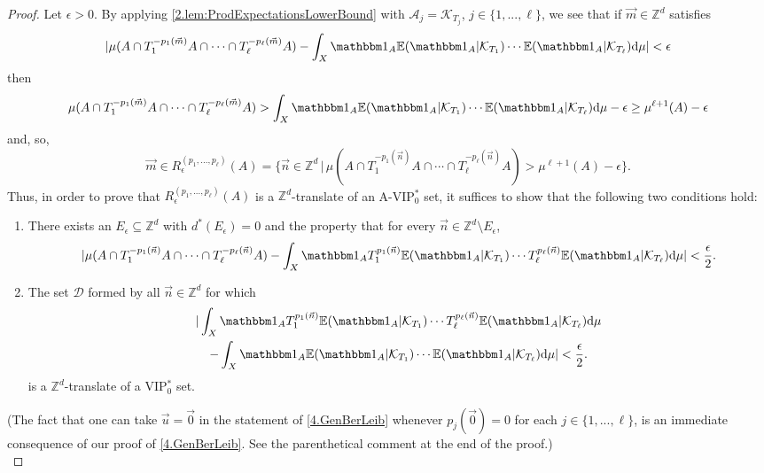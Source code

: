 \documentclass[11pt,american,preprint]{elsarticle}
\numberwithin{equation}{section}
\theoremstyle{plain}
\theoremstyle{plain*}
\theoremstyle{plain}
\theoremstyle{plain*}
\theoremstyle{plain}
\theoremstyle{plain*}
\theoremstyle{remark}
\theoremstyle{remark*}
\theoremstyle{remark}
\theoremstyle{remark*}
\theoremstyle{remark}
\theoremstyle{remark*}
\theoremstyle{plain}
\theoremstyle{definition}
\theoremstyle{plain}
\theoremstyle{plain} %
\newcommand{\Z}{\mathbb{Z}}
\begin{document}
\begin{proof}
Let $\epsilon>0$. By applying 
\cref{2.lem:ProdExpectationsLowerBound} with $\mathcal A_j=\mathcal K_{T_j}$, $j\in\{1,...,\ell\}$, we see that if $\vec m\in\Z^d$ satisfies 
\begin{equation}\label{5.LowerBound}
|\mu(A\cap T_1^{-p_1(\vec m)}A\cap \cdots\cap T_\ell^{-p_\ell(\vec m)}A)-\int_X \mathbbm 1_A\mathbb E(\mathbbm 1_A|\mathcal K_{T_1})\cdots\mathbb E(\mathbbm 1_A|\mathcal K_{T_\ell})\text{d}\mu|<\epsilon
\end{equation}
then 
$$\mu(A\cap T_1^{-p_1(\vec m)}A\cap \cdots\cap T_\ell^{-p_\ell(\vec m)}A)>\int_X \mathbbm 1_A\mathbb E(\mathbbm 1_A|\mathcal K_{T_1})\cdots\mathbb E(\mathbbm 1_A|\mathcal K_{T_\ell})\text{d}\mu-\epsilon\geq \mu^{\ell+1}(A)-\epsilon$$
and, so, 
$$\vec m\in R^{(p_1,...,p_\ell)}_\epsilon(A)=\{\vec n\in\Z^d\,|\,\mu(A\cap T_1^{-p_1(\vec n)}A\cap \cdots\cap T_\ell^{-p_\ell(\vec n)}A)>\mu^{\ell+1}(A)-\epsilon\}.$$ 
Thus, in order to prove that $R^{(p_1,...,p_\ell)}_\epsilon(A)$ is a $\Z^d$-translate of an A-VIP$_0^*$ set, it suffices to show that the following two conditions hold:
\begin{enumerate}
    \item [(C.1)] There exists an $E_\epsilon\subseteq \Z^d$ with $d^*(E_\epsilon)=0$ and the property that for every $\vec n\in \Z^d\setminus E_\epsilon$,
    \begin{equation}\label{4.eq:CondtionC1}
    |\mu(A\cap T_1^{-p_1(\vec n)}A\cap \cdots\cap T_\ell^{-p_\ell(\vec n)}A)
    -\int_X \mathbbm 1_{A} T_1^{p_1(\vec n)}\mathbb E(\mathbbm 1_{A}|\mathcal K_{T_1})\cdots T_\ell^{p_
\ell(\vec n)}\mathbb E(\mathbbm 1_{A}|\mathcal K_{T_\ell})\text{d}\mu|<\frac{\epsilon}{2}.
\end{equation}
\item [(C.2)] The set $\mathcal D$ formed by all $\vec n\in\Z^d$ for which 
\begin{multline}\label{5.eq:CloseReturn}
|\int_X \mathbbm 1_A T_1^{p_1(\vec n)}\mathbb E(\mathbbm 1_A|\mathcal K_{T_1})\cdots T_\ell^{p_
\ell(\vec n)}\mathbb E(\mathbbm 1_A|\mathcal K_{T_\ell})\text{d}\mu\\
-\int_X \mathbbm 1_A\mathbb E(\mathbbm 1_A|\mathcal K_{T_1})\cdots\mathbb E(\mathbbm 1_A|\mathcal K_{T_\ell})\text{d}\mu|<\frac{\epsilon}{2}.
\end{multline}
is a $\Z^d$-translate of a  VIP$_0^*$ set.
\end{enumerate}
(The fact that one can take ${\vec u}=\vec 0$ in the statement of \cref{4.GenBerLeib} whenever $p_j(\vec 0)=0$ for each $j\in\{1,...,\ell\}$, is an immediate consequence of our proof of \cref{4.GenBerLeib}. See the parenthetical comment  at the end of the proof.)\\ 


\end{proof}
\end{document}
